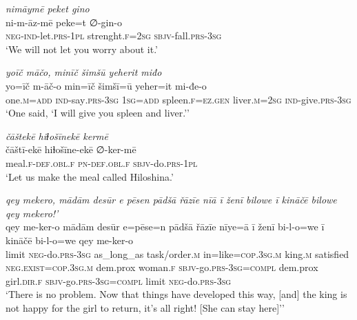 \ea \label{ŽP.235}
\textit{nimāymē peket gino} \\ 
\gll ni-m-āz-mē peke=t ∅-gin-o \\ 
 \textsc{neg-}\textsc{ind-}let\textsc{.prs}\textsc{-1pl} strenght\textsc{.f}\textsc{=\textsc{2sg}} \textsc{sbjv-}fall\textsc{.prs}\textsc{-3sg} \\ 
\glt `We will not let you worry about it.'
\z 
 
\ea \label{ŽP.238}
\textit{yoīč māčo, minīč šimšū yeherit miđo} \\ 
\gll yo=īč m-āč-o min=īč šimšī=ū yeher=it mi-đe-o \\ 
 one\textsc{.m}\textsc{=add} \textsc{ind-}say\textsc{.prs}\textsc{-3sg} \textsc{1sg}\textsc{=add} spleen\textsc{.f}\textsc{\textsc{=ez.gen}} liver\textsc{.m}\textsc{=\textsc{2sg}} \textsc{ind-}give\textsc{.prs}\textsc{-3sg} \\ 
\glt `One said, ‘I will give you spleen and liver.’'
\z 
 
\ea \label{ŽP.241}
\textit{čāštekē hiɫošīnekē kermē} \\ 
\gll čāštī-ekē hiɫošīne-ekē ∅-ker-mē \\ 
 meal\textsc{.f}\textsc{-def}\textsc{.obl}\textsc{.f} \textsc{pn}\textsc{-def}\textsc{.obl}\textsc{.f} \textsc{sbjv-}do\textsc{.prs}\textsc{-1pl} \\ 
\glt `Let us make the meal called Hiloshina.'
\z 
 
\ea \label{ŽP.242}
\textit{qey mekero, mādām desūr e pēsen pādšā řāzīe nīā ī ženī bilowe ī kināčē bilowe qey mekero!’} \\ 
\gll qey me-ker-o mādām desūr e=pēse=n pādšā řāzīe nīye=ā ī ženī bi-l-o=we ī kināčē bi-l-o=we qey me-ker-o \\ 
 limit \textsc{neg-}do\textsc{.prs}\textsc{-3sg} as\_long\_as task/order\textsc{.m} in=like\textsc{=cop}\textsc{.3sg}\textsc{.m} king\textsc{.m} satisfied \textsc{\textsc{neg.}exist}\textsc{=cop}\textsc{.3sg}\textsc{.m} dem.prox woman\textsc{.f} \textsc{sbjv-}go\textsc{.prs}\textsc{-3sg}\textsc{=compl} dem.prox girl\textsc{.dir}\textsc{.f} \textsc{sbjv-}go\textsc{.prs}\textsc{-3sg}\textsc{=compl} limit \textsc{neg-}do\textsc{.prs}\textsc{-3sg} \\ 
\glt `There is no problem. Now that things have developed this way, [and] the king is not happy for the girl to return, it’s all right! [She can stay here]’'
\z 
 
